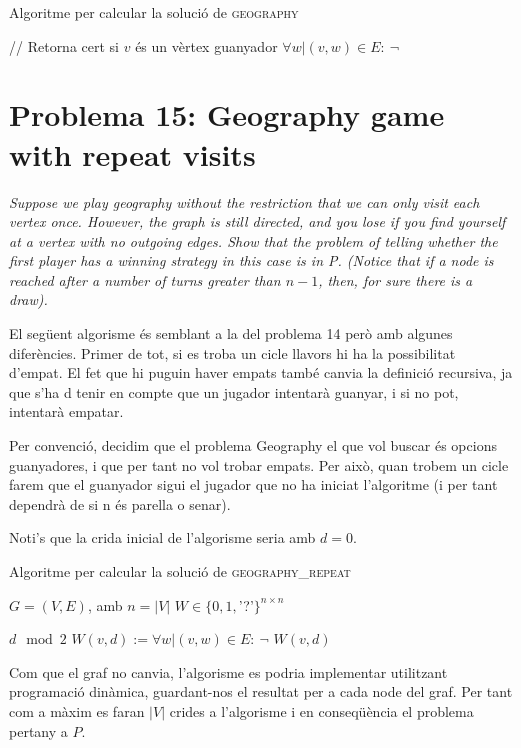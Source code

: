 \documentclass[a4paper]{article}
\begin{document}
\begin{algorithm}[H]
	\caption{Algoritme per calcular la solució de \textsc{geography}}
	\begin{algorithmic}[1]
		\State // Retorna cert si $v$ és un vèrtex guanyador
			\State \Return $\forall w | (v,w) \in E : \ \neg$ 
		\EndFunction
	\end{algorithmic}
\end{algorithm}

\pagebreak
\section{Problema 15: Geography game with repeat visits}
\emph{Suppose we play geography without the restriction that we can only visit each vertex once. However, the graph is still directed, and you lose if you find yourself at a vertex with no outgoing edges. Show that the problem of telling whether the first player has a winning strategy in this case is in P. (Notice that if a node is reached after a number of turns greater than $n − 1$, then, for sure there is a draw).}

El següent algorisme és semblant a la del problema 14 però amb algunes diferències. Primer de tot, si es troba un cicle llavors hi ha la possibilitat d'empat. El fet que hi puguin haver empats també canvia la definició recursiva, ja que s'ha d tenir en compte que un jugador intentarà guanyar, i si no pot, intentarà empatar.

Per convenció, decidim que el problema Geography el que vol buscar és opcions guanyadores, i que per tant no vol trobar empats. Per això, quan trobem un cicle farem que el guanyador sigui el jugador que no ha iniciat l'algoritme (i per tant dependrà de si n és parella o senar).

Noti's que la crida inicial de l'algorisme seria amb $d=0$.

\begin{algorithm}[H]
	\caption{Algoritme per calcular la solució de \textsc{geography\_repeat}}
	\begin{algorithmic}[1]
		\State $G = (V, E)$, amb $n = |V|$
		\State $W \in \{0,1,$'?'$\}^{n\times n}$

				\State \Return $d \mod 2$
			\EndIf
				\State $W(v,d) := \forall w | (v,w) \in E : \ \neg$ 
			\EndIf
			\State \Return $W(v,d)$
		\EndFunction
	\end{algorithmic}
\end{algorithm}

Com que el graf no canvia, l'algorisme es podria implementar utilitzant programació dinàmica, guardant-nos el resultat per a cada node del graf. Per tant com a màxim es faran $|V|$ crides a l'algorisme i en conseqüència el problema pertany a $P$.
\end{document}
